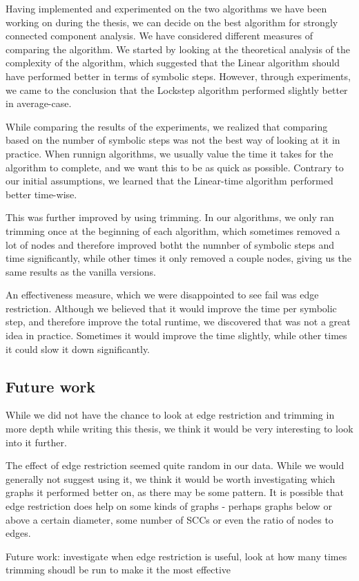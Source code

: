 \documentclass[../master/master.tex]{subfiles}
\begin{document}
Having implemented and experimented on the two algorithms we have been working on during the thesis, we can decide on the best algorithm for strongly connected component analysis. We have considered different measures of comparing the algorithm. We started by looking at the theoretical analysis of the complexity of the algorithm, which suggested that the Linear algorithm should have performed better in terms of symbolic steps. However, through experiments, we came to the conclusion that the Lockstep algorithm performed slightly better in average-case.

While comparing the results of the experiments, we realized that comparing based on the number of symbolic steps was not the best way of looking at it in practice. When runnign algorithms, we usually value the time it takes for the algorithm to complete, and we want this to be as quick as possible. Contrary to our initial assumptions, we learned that the Linear-time algorithm performed better time-wise.

This was further improved by using trimming. In our algorithms, we only ran trimming once at the beginning of each algorithm, which sometimes removed a lot of nodes and therefore improved botht the numnber of symbolic steps and time significantly, while other times it only removed a couple nodes, giving us the same results as the vanilla versions.

An effectiveness measure, which we were disappointed to see fail was edge restriction. Although we believed that it would improve the time per symbolic step, and therefore improve the total runtime, we discovered that was not a great idea in practice. Sometimes it would improve the time slightly, while other times it could slow it down significantly.

\subsection{Future work}
While we did not have the chance to look at edge restriction and trimming in more depth while writing this thesis, we think it would be very interesting to look into it further.

The effect of edge restriction seemed quite random in our data. While we would generally not suggest using it, we think it would be worth investigating which graphs it performed better on, as there may be some pattern. It is possible that edge restriction does help on some kinds of graphs - perhaps graphs below or above a certain diameter, some number of SCCs or even the ratio of nodes to edges. 


Future work: investigate when edge restriction is useful, look at how many times trimming shoudl be run to make it the most effective
\end{document}
